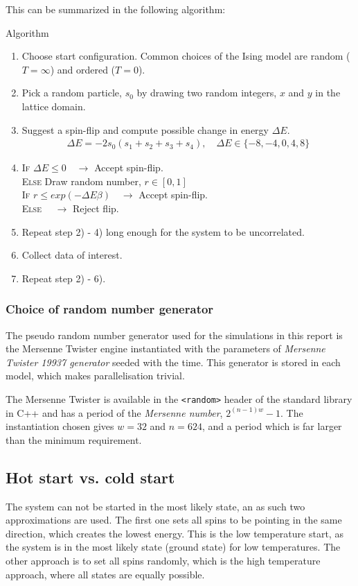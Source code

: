 \documentclass[11pt,a4paper,draft]{article}
\numberwithin{equation}{section}
\newcounter{algcounter}
\renewcommand{\thealgcounter}{\Roman{algcounter}}
\newenvironment{algorithm}{%
\refstepcounter{algcounter}
\begin{tcolorbox}
\centerline{Algorithm \thealgcounter}\vspace{2mm}
}
{\end{tcolorbox}}
\begin{document}
This can be summarized in the following algorithm:
\begin{algorithm}
\begin{enumerate}[label=\arabic*)]
\item Choose start configuration. Common choices of the Ising model 
are random ($T= \infty$) and ordered ($T= 0$). 
\item Pick a random particle, $s_0$ by drawing two random integers,
$x$ and $y$ in the lattice domain.
\item Suggest a spin-flip and compute possible change in 
energy $\Delta E$.
\begin{align*} 
\Delta E = -2s_0(s_1+s_2+s_3+s_4), \quad \Delta E \in \{-8,-4,0,4,8 \} 
\end{align*} 
\item \textsc{If} $\Delta E \leq 0 \quad \to$ Accept spin-flip. \\
\textsc{Else} Draw random number, $r \in [0,1]$ \\
\textsc{	If} $r \leq exp(-\Delta E \beta ) \quad \to$ Accept spin-flip. \\
\textsc{Else} $\quad \to$ Reject flip. 

\item Repeat step 2) - 4) long enough for the system to be 
uncorrelated.

\item Collect data of interest. 

\item Repeat step 2) - 6). 
\end{enumerate}
\end{algorithm}

\subsubsection{Choice of random number generator}
The pseudo random number generator used for the simulations in 
this report is the Mersenne Twister engine
instantiated with the parameters of 
\emph{Mersenne Twister 19937 generator} seeded with the time.
This generator is stored in each model, which makes 
parallelisation trivial.

The Mersenne Twister is available in the \texttt{<random>} header 
of the standard
library in C++ and has a period of the \emph{Mersenne number},
$2^{(n-1)w}-1$.
The instantiation chosen gives $w=32$ and $n=624$, and a period which is 
far larger than the minimum requirement.

\subsection{Hot start vs. cold start}
The system can not be started in the most likely state, an as such two 
approximations are used. The first one sets all spins to be pointing in 
the same direction, which creates the lowest energy. This is the 
low temperature start, as the system is in the most likely state 
(ground state) for low temperatures. The other approach is to set 
all spins randomly, which is the high temperature approach, where 
all states are equally possible.
\end{document}
